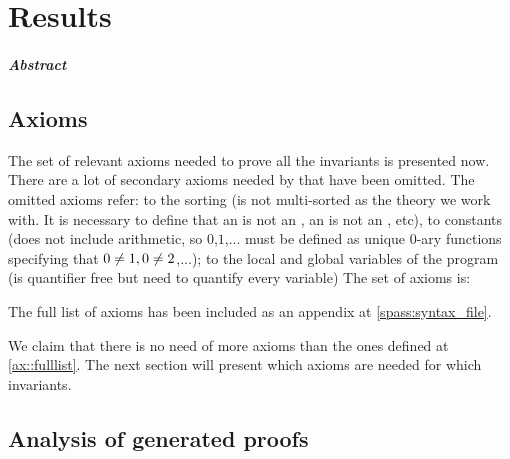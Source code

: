 \chapter{Results\label{chap:results}}

\paragraph{Abstract}


\section{Axioms}

The set of relevant axioms needed to prove all the invariants is presented now.
%
There are a lot of secondary axioms needed by \spass that have been omitted. 
%
The omitted axioms refer: 
%
to the sorting (\spass is not multi-sorted as the theory we work with. It is necessary to define that an \addr is not an \elem, an \elem is not an \addr, etc), to constants (\spass does not include arithmetic, so $0$,$1$,... must be defined as unique 0-ary functions specifying that $0\not= 1,0\not= 2$,...); 
%
to the local and global variables of the program (\leap is quantifier free but \spass need to quantify every variable)
%
The set of axioms is:
		
\begin{description}
\label{ax::fulllist}

\end{description}


The full list of axioms has been included as an appendix at \ref{spass:syntax_file}. 

%

We claim that there is no need of more axioms than the ones defined at \ref{ax::fulllist}. 
%
The next section will present which axioms are needed for which invariants.

\section{Analysis of generated proofs}
\label{proof:Preserve}
\label{sec:axiomgraph}

